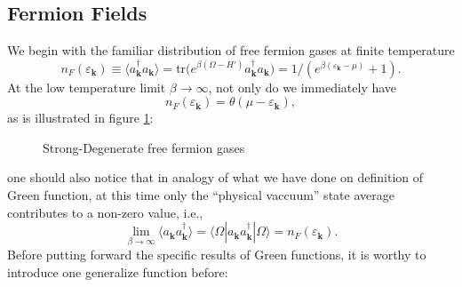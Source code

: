 \documentclass[b5paper,10pt,UTF8]{book}
\numberwithin{equation}{section}
\begin{document}
		\subsection{Fermion Fields}
			We begin with the familiar distribution of free fermion gases at finite temperature
			\begin{equation}\label{2.3.1}
				n_F(\varepsilon_{\bm{k}})\equiv\langle a_{\bm{k}}^\dagger a_{\bm{k}}\rangle=\mathrm{tr}\bigg(e^{\beta(\Omega-H')}a_{\bm{k}}^\dagger a_{\bm{k}}\bigg)=1\bigg/ \left(e^{\beta(\varepsilon_{\bm{k}}-\mu)}+1\right).
			\end{equation}
			At the low temperature limit $\beta\rightarrow\infty$, not only do we immediately have
			\begin{equation}\label{2.3.2}
				n_F(\varepsilon_{\bm k})=\theta(\mu-\varepsilon_{\bm k}),
			\end{equation}
			as is illustrated in figure \ref{fig:1}:\par
			\begin{figure}[!htp]
				\centering
				\caption{Strong-Degenerate free fermion gases}
				\label{fig:1}
			\end{figure}
			one should also notice that in analogy of what we have done on definition of Green function, at this time only the ``physical vaccuum'' state average contributes to a non-zero value, i.e.,
			$$\lim_{\beta\rightarrow\infty}\langle a_{\bm{k}} a_{\bm{k}}^\dagger\rangle=\langle\Omega|a_{\bm{k}}a_{\bm{k}}^\dagger|\Omega\rangle=n_F(\varepsilon_{\bm{k}}).$$
			Before putting forward the specific results of Green functions, it is worthy to introduce one generalize function before:
\end{document}

